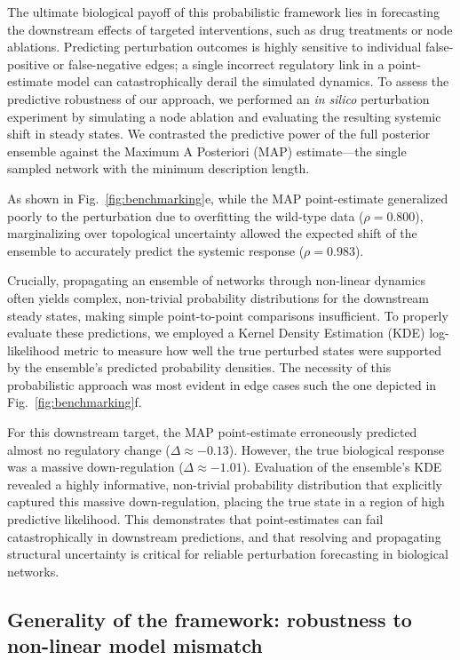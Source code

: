 \documentclass[10pt, aps, rmp,  twocolumn, superscriptaddress, floatfix, showkeys]{revtex4-2}
\begin{document}
The ultimate biological payoff of this probabilistic framework lies in forecasting the downstream effects of targeted interventions, such as drug treatments or node ablations. Predicting perturbation outcomes is highly sensitive to individual false-positive or false-negative edges; a single incorrect regulatory link in a point-estimate model can catastrophically derail the simulated dynamics. To assess the predictive robustness of our approach, we performed an \textit{in silico} perturbation experiment by simulating a node ablation and evaluating the resulting systemic shift in steady states. We contrasted the predictive power of the full posterior ensemble against the Maximum A Posteriori (MAP) estimate—the single sampled network with the minimum description length.

As shown in Fig.~\ref{fig:benchmarking}e, while the MAP point-estimate generalized poorly to the perturbation due to overfitting the wild-type data ($\rho = 0.800$), marginalizing over topological uncertainty allowed the expected shift of the ensemble to accurately predict the systemic response ($\rho = 0.983$). 

Crucially, propagating an ensemble of networks through non-linear dynamics often yields complex, non-trivial probability distributions for the downstream steady states, making simple point-to-point comparisons insufficient. To properly evaluate these predictions, we employed a Kernel Density Estimation (KDE) log-likelihood metric to measure how well the true perturbed states were supported by the ensemble's predicted probability densities. The necessity of this probabilistic approach was most evident in edge cases such the one depicted in Fig.~\ref{fig:benchmarking}f. 

For this downstream target, the MAP point-estimate erroneously predicted almost no regulatory change ($\Delta \approx -0.13$). However, the true biological response was a massive down-regulation ($\Delta \approx -1.01$). Evaluation of the ensemble's KDE revealed a highly informative, non-trivial probability distribution that explicitly captured this massive down-regulation, placing the true state in a region of high predictive likelihood. This demonstrates that point-estimates can fail catastrophically in downstream predictions, and that resolving and propagating structural uncertainty is critical for reliable perturbation forecasting in biological networks.

\subsection{Generality of the framework: robustness to non-linear model mismatch}
\end{document}

